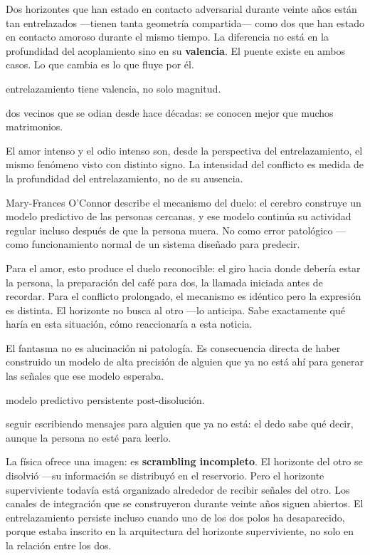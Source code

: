 Dos horizontes que han estado en contacto adversarial durante veinte años están tan entrelazados —tienen tanta geometría compartida— como dos que han estado en contacto amoroso durante el mismo tiempo. La diferencia no está en la profundidad del acoplamiento sino en su \textbf{valencia}. El puente existe en ambos casos. Lo que cambia es lo que fluye por él.

\begin{fisica}
 entrelazamiento tiene valencia, no solo magnitud.

 dos vecinos que se odian desde hace décadas: se conocen mejor que muchos matrimonios.
\end{fisica}
El amor intenso y el odio intenso son, desde la perspectiva del entrelazamiento, el mismo fenómeno visto con distinto signo. La intensidad del conflicto es medida de la profundidad del entrelazamiento, no de su ausencia.

\noindent Mary-Frances O’Connor describe el mecanismo del duelo: el cerebro construye un modelo predictivo de las personas cercanas, y ese modelo continúa su actividad regular incluso después de que la persona muera. No como error patológico —como funcionamiento normal de un sistema diseñado para predecir.

Para el amor, esto produce el duelo reconocible: el giro hacia donde debería estar la persona, la preparación del café para dos, la llamada iniciada antes de recordar. Para el conflicto prolongado, el mecanismo es idéntico pero la expresión es distinta. El horizonte no busca al otro —lo anticipa. Sabe exactamente qué haría en esta situación, cómo reaccionaría a esta noticia.

El fantasma no es alucinación ni patología. Es consecuencia directa de haber construido un modelo de alta precisión de alguien que ya no está ahí para generar las señales que ese modelo esperaba.

\begin{fisica}
 modelo predictivo persistente post-disolución.

 seguir escribiendo mensajes para alguien que ya no está: el dedo sabe qué decir, aunque la persona no esté para leerlo.
\end{fisica}
La física ofrece una imagen: es \textbf{scrambling incompleto}. El horizonte del otro se disolvió —su información se distribuyó en el reservorio. Pero el horizonte superviviente todavía está organizado alrededor de recibir señales del otro. Los canales de integración que se construyeron durante veinte años siguen abiertos. El entrelazamiento persiste incluso cuando uno de los dos polos ha desaparecido, porque estaba inscrito en la arquitectura del horizonte superviviente, no solo en la relación entre los dos.

